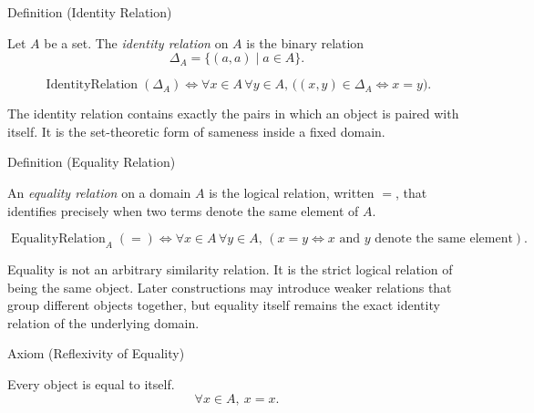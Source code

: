 \begin{definitionbox}{Definition (Identity Relation)}
\begin{definition}
\label{def:identity-relation}
Let $A$ be a set. The \emph{identity relation} on $A$ is the binary relation
\[
\Delta_A = \{(a,a) \mid a \in A\}.
\]
\end{definition}

\begin{remark*}
\[
\operatorname{IdentityRelation}(\Delta_A)
\Longleftrightarrow
\forall x \in A\, \forall y \in A,\,
\bigl((x,y) \in \Delta_A \Longleftrightarrow x = y\bigr).
\]
\end{remark*}

\begin{remark*}[Interpretation]
The identity relation contains exactly the pairs in which an object is paired
with itself. It is the set-theoretic form of sameness inside a fixed domain.
\end{remark*}

\NoLocalDependencies
\end{definitionbox}

\begin{definitionbox}{Definition (Equality Relation)}
\begin{definition}
\label{def:equality-relation}
An \emph{equality relation} on a domain $A$ is the logical relation, written
$=$, that identifies precisely when two terms denote the same element of $A$.
\end{definition}

\begin{remark*}
\[
\operatorname{EqualityRelation}_A(=)
\Longleftrightarrow
\forall x \in A\, \forall y \in A,\,
(x = y \Longleftrightarrow x \text{ and } y \text{ denote the same element}).
\]
\end{remark*}

\begin{remark*}[Interpretation]
Equality is not an arbitrary similarity relation. It is the strict logical
relation of being the same object. Later constructions may introduce weaker
relations that group different objects together, but equality itself remains
the exact identity relation of the underlying domain.
\end{remark*}

\NoLocalDependencies
\end{definitionbox}

\begin{axiombox}{Axiom (Reflexivity of Equality)}
\begin{axiom}
\label{ax:equality-reflexivity}
Every object is equal to itself.
\[
\forall x \in A,\ x=x.
\]
\end{axiom}
\end{axiombox}

